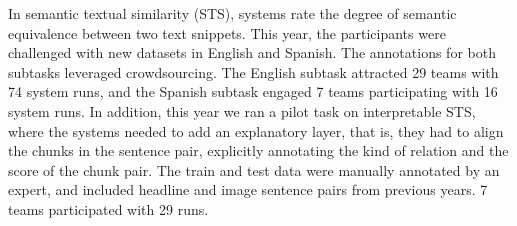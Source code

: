 In semantic textual similarity (STS), systems rate the degree of semantic equivalence between two text snippets. This year, the participants were challenged with new datasets in English and Spanish. The annotations for both subtasks leveraged crowdsourcing. The English subtask attracted 29 teams with 74 system runs, and the Spanish subtask engaged 7 teams participating with 16 system runs. In addition, this year we ran a pilot task on interpretable STS, where the systems needed to add an explanatory layer, that is, they had to align the chunks in the sentence pair, explicitly annotating the kind of relation and the score of the chunk pair. The train and test data were manually annotated by an expert, and included headline and image sentence pairs from previous years. 7 teams participated with 29 runs.
